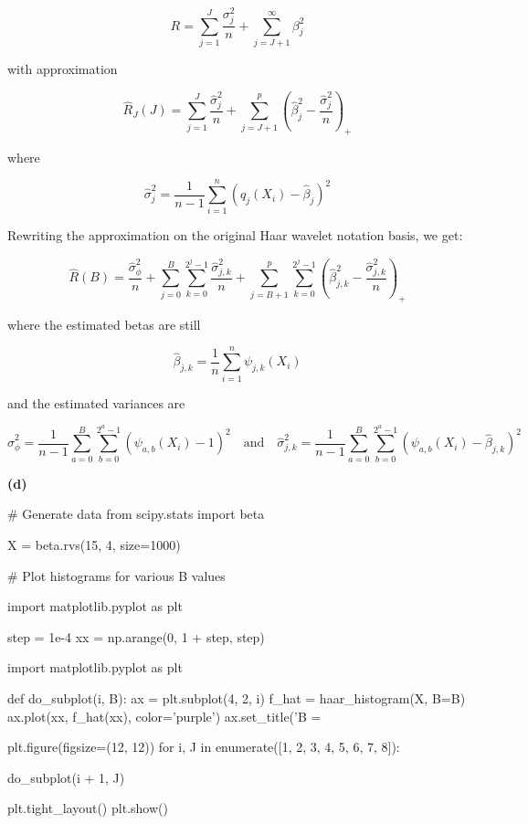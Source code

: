\[ R = \sum_{j=1}^J \frac{\sigma_{j}^{2}}{n} + \sum_{j=J+1}^{\infty} \beta_{j}^{2} \]

with approximation

\[ \hat{R}_J(J) = \sum_{j=1}^J \frac{\hat{\sigma}_{j}^{2}}{n} + \sum_{j=J+1}^p \left( \hat{\beta}_{j}^{2} - \frac{\hat{\sigma}_{j}^{2}}{n} \right)_{+} \]

where

\[ \hat{\sigma}_{j}^{2} = \frac{1}{n - 1} \sum_{i=1}^{n} \left( q_{j}(X_{i}) - \hat{\beta}_{j}\right)^{2} \]

Rewriting the approximation on the original Haar wavelet notation basis,
we get:

\[ \hat{R}(B) = \frac{\hat{\sigma}_\phi^{2}}{n} 
+ \sum_{j=0}^B \sum_{k=0}^{2^{j} - 1} \frac{\hat{\sigma}_{j, k}^{2}}{n}
+ \sum_{j=B+1}^p \sum_{k=0}^{2^{j} - 1} \left( \hat{\beta}_{j, k}^{2} - \frac{\hat{\sigma}_{j, k}^{2}}{n} \right)_+
\]

where the estimated betas are still

\[ \hat{\beta}_{j, k} = \frac{1}{n} \sum_{i=1}^{n} \psi_{j, k} (X_{i})\]

and the estimated variances are

\[ 
\hat{\sigma}_\phi^{2} = \frac{1}{n - 1} \sum_{a=0}^B \sum_{b=0}^{2^{a} - 1} \left( \psi_{a, b}(X_{i}) - 1\right)^{2}
\quad \text{and} \quad
\hat{\sigma}_{j, k}^{2} = \frac{1}{n - 1} \sum_{a=0}^B \sum_{b=0}^{2^{a} - 1} \left( \psi_{a, b}(X_{i}) - \hat{\beta}_{j, k}\right)^{2} 
\]

\textbf{(d)}

\begin{python}
# Generate data
from scipy.stats import beta

X = beta.rvs(15, 4, size=1000)
\end{python}

\begin{python}
# Plot histograms for various B values

import matplotlib.pyplot as plt

step = 1e-4
xx = np.arange(0, 1 + step, step)

import matplotlib.pyplot as plt

def do_subplot(i, B):
    ax = plt.subplot(4, 2, i)
    f_hat = haar_histogram(X, B=B)
    ax.plot(xx, f_hat(xx), color='purple')
    ax.set_title('B = %
    
plt.figure(figsize=(12, 12))
for i, J in enumerate([1, 2, 3, 4, 5, 6, 7, 8]):
    
    do_subplot(i + 1, J)

plt.tight_layout()
plt.show()
\end{python}


